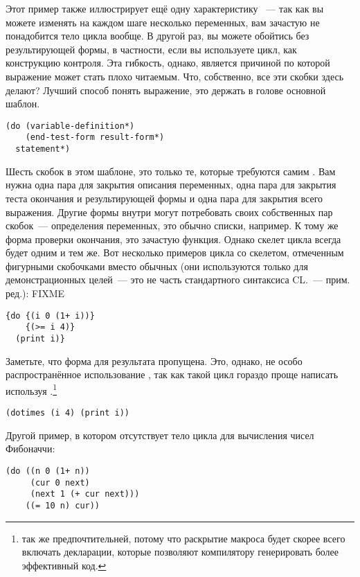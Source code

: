Этот пример также иллюстрирует ещё одну характеристику ~--- так как вы можете
изменять на каждом шаге несколько переменных, вам зачастую не понадобится тело цикла
вообще. В другой раз, вы можете обойтись без результирующей формы, в частности, если вы
используете цикл, как конструкцию контроля. Эта гибкость, однако, является причиной по
которой выражение  может стать плохо читаемым. Что, собственно, все эти скобки
здесь делают? Лучший способ понять  выражение, это держать в голове основной
шаблон.

\begin{lstlisting}
(do (variable-definition*)
    (end-test-form result-form*)
  statement*)
\end{lstlisting}

Шесть скобок в этом шаблоне, это только те, которые требуются самим . Вам нужна
одна пара для закрытия описания переменных, одна пара для закрытия теста окончания и
результирующей формы и одна пара для закрытия всего выражения. Другие формы внутри
 могут потребовать своих собственных пар скобок~--- определения переменных, это
обычно списки, например. К тому же форма проверки окончания, это зачастую функция. Однако
скелет  цикла всегда будет одним и тем же. Вот несколько примеров цикла 
со скелетом, отмеченным фигурными скобочками вместо обычных (они используются только для
демонстрационных целей~--- это не часть стандартного синтаксиса CL.~--- прим. ред.): FIXME

\begin{lstlisting}
{do {(i 0 (1+ i))}
    {(>= i 4)}
  (print i)}
\end{lstlisting}

Заметьте, что форма для результата пропущена. Это, однако, не особо распространённое
использование , так как такой цикл гораздо проще написать используя
.\footnote{ так же предпочтительней, потому что раскрытие
  макроса будет скорее всего включать декларации, которые позволяют компилятору
  генерировать более эффективный код.}

\begin{lstlisting}
(dotimes (i 4) (print i))
\end{lstlisting}

Другой пример, в котором отсутствует тело цикла для вычисления чисел Фибоначчи:

\begin{lstlisting}
(do ((n 0 (1+ n))
     (cur 0 next)
     (next 1 (+ cur next)))
    ((= 10 n) cur))
\end{lstlisting}

